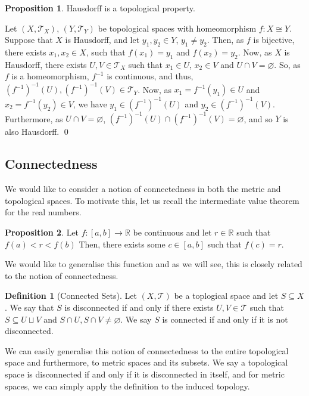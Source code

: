 \documentclass[
]{article}
\theoremstyle{definition}
\newtheorem{prop}{Proposition}
\theoremstyle{definition}
\newtheorem{definition}{Definition}[section]
\begin{document}
\begin{prop}
  Hausdorff is a topological property. 
\end{prop}
\proof

Let \((X, \mathcal{T}_X)\), \((Y, \mathcal{T}_Y)\) be topological spaces
with homeomorphism \(f : X \cong Y\). Suppose that \(X\) is Hausdorff,
and let \(y_1, y_2 \in Y\), \(y_1 \neq y_2\). Then, as \(f\) is
bijective, there exists \(x_1, x_2 \in X\), such that \(f(x_1) = y_1\)
and \(f(x_2) = y_2\). Now, as \(X\) is Hausdorff, there exists
\(U, V \in \mathcal{T}_X\) such that \(x_1 \in U\), \(x_2 \in V\) and
\(U \cap V = \varnothing\). So, as \(f\) is a homeomorphism, \(f^{-1}\)
is continuous, and thus,
\((f^{-1})^{-1}(U), (f^{-1})^{-1}(V) \in \mathcal{T}_Y\). Now, as
\(x_1 = f^{-1}(y_1) \in U\) and \(x_2 = f^{-1}(y_2) \in V\), we have
\(y_1 \in (f^{-1})^{-1}(U)\) and \(y_2 \in (f^{-1})^{-1}(V)\).
Furthermore, as \(U \cap V = \varnothing\),
\((f^{-1})^{-1}(U) \cap (f^{-1})^{-1}(V) =  \varnothing\), and so \(Y\)
is also Hausdorff. \qed

\hypertarget{connectedness}{%
\subsection{Connectedness}\label{connectedness}}

We would like to consider a notion of connectedness in both the metric
and topological spaces. To motivate this, let us recall the intermediate
value theorem for the real numbers.

\begin{prop}
  Let \(f : [a, b] \to \mathbb{R}\) be continuous and let \(r \in \mathbb{R}\) 
  such that \(f(a) < r < f(b)\) Then, there exists some \(c \in [a, b]\) such 
  that \(f(c) = r\).
\end{prop}

We would like to generalise this function and as we will see, this is
closely related to the notion of connectedness.

\begin{definition}[Connected Sets]
  Let \((X, \mathcal{T})\) be a toplogical space and let \(S \subseteq X\). 
  We say that \(S\) is disconnected if and only if there exists 
  \(U, V \in \mathcal{T}\) such that \(S \subseteq U \sqcup V\) and 
  \(S \cap U, S \cap V \neq \varnothing\). We say \(S\) is connected if and only 
  if it is not disconnected.
\end{definition}

We can easily generalise this notion of connectedness to the entire
topological space and furthermore, to metric spaces and its subsets. We
say a topological space is disconnected if and only if it is
disconnected in itself, and for metric spaces, we can simply apply the
definition to the induced topology.
\end{document}
